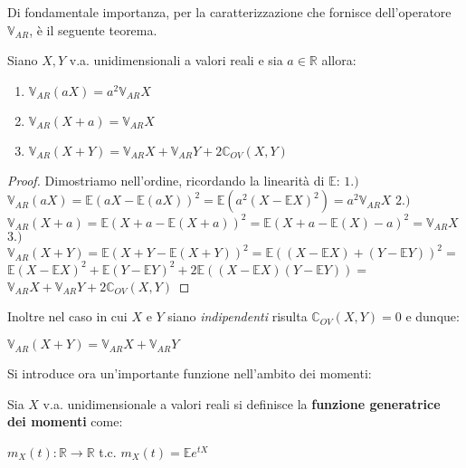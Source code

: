\vspace{10px}
\noindent

Di fondamentale importanza, per la caratterizzazione che fornisce dell'operatore $\mathbb{V}_{AR}$, è il seguente teorema.


\newcommand{\V}{\mathbb{V}_{AR}}
\newcommand{\C}{\mathbb{C}_{OV}}
\newcommand{\E}{\mathbb{E}}

\begin{theorem}
Siano $X,Y$ v.a. unidimensionali a valori reali e sia $a\in\mathbb{R}$ allora:
\begin{enumerate}
    \item $\V(aX)=a^2\V X$
    \item $\V(X+a)=\V X$
    \item $\V(X+Y)=\V X+\V Y+2\C(X,Y)$
\end{enumerate}
\begin{proof}
Dimostriamo nell'ordine, ricordando la linearità di $\E$:
\vspace{10px}
\newline
\noindent
$1.)$ $\V(aX)=\E(aX-\E(aX))^2=\E(a^2(X-\E X)^2)=a^2\V X$
\vspace{12px}
\newline
\noindent
$2.)$ $\V(X+a)=\E(X+a-\E(X+a))^2=\E(X+a-\E(X)-a)^2=\V X$
\vspace{1px}
\newline
\noindent
$3.)$ $\V(X+Y)=\E(X+Y-\E(X+Y))^2=\E((X-\E X)+(Y-\E Y))^2=$
\vspace{5px}
\newline
\noindent
$\E(X-\E X)^2+\E(Y-\E Y)^2+2\E((X-\E X)(Y-\E Y))=$
\vspace{5px}
\newline
\noindent
$\V X+\V Y+2\C(X,Y)$
\end{proof}
\end{theorem}

\vspace{10px}
Inoltre nel caso in cui $X$ e $Y$ siano \textit{indipendenti} risulta $\C(X,Y)=0$ e dunque:
\begin{center}
    $\V(X+Y)=\V X+\V Y$
\end{center}

\vspace{15px}

Si introduce ora un'importante funzione nell'ambito dei momenti:

\begin{definition}
Sia $X$ v.a. unidimensionale a valori reali si definisce la \textbf{funzione generatrice dei momenti} come:
\begin{center}
    $m_X(t):\mathbb{R}\longrightarrow\mathbb{R}$ \hspace{3px} t.c. \hspace{3px} $m_X(t)=\E e^{tX}$
\end{center}
\end{definition}

